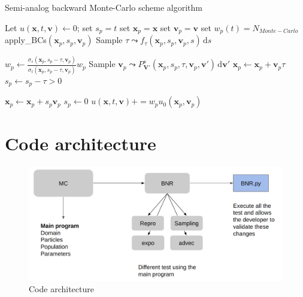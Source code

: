 \documentclass[a4paper, 11pt]{article}
\newcommand{\bm}{\symbf}
\newcommand{\di}{\ensuremath{\, \mathrm{d}}}
\begin{document}
\begin{algorithm}
	\caption{Semi-analog backward Monte-Carlo scheme algorithm}
	\begin{algorithmic}[1]
		\State Let $u(\bm{x}, t, \bm{v}) \gets 0$;
		\State set $s_p = t$
		\State set $\bm{x}_p = \bm{x}$
		\State set $\bm{v}_p = \bm{v}$
		\State set $w_p(t) = N_{Monte-Carlo}$
		\If{$\bm{x}_p \not \in \mathcal{D}$}
		\State apply\_BCs$(\bm{x}_p, s_p, \bm{v}_p)$
		\EndIf
		\State Sample $\tau \leadsto f_\tau(\bm{x}_p, s_p, \bm{v}_p, s) \di s$
		
		\State $w_p \gets \frac{\sigma_s(\bm{x}_p, s_p - \tau, \bm{v}_p)}{\sigma_t(\bm{x}_p, s_p - \tau, \bm{v}_p)} w_p$
		\State Sample $\bm{v}_p \leadsto P_{\bm{V}'}^s(\bm{x}_p, s_p, \tau, \bm{v}_p, \bm{v}') \di \bm{v}'$
		\State $\bm{x}_p \gets \bm{x}_p + \bm{v}_p \tau$
		\State $s_p \gets s_p - \tau > 0$
		
		\Else
		\State $\bm{x}_p \gets \bm{x}_p + s_p \bm{v}_p$
		\State $s_p \gets 0$
		\State $u(\bm{x}, t, \bm{v}) += w_p u_0(\bm{x}_p, \bm{v}_p)$
		\EndIf
		\EndWhile
		\EndFor
	\end{algorithmic}
\end{algorithm}






\section{Code architecture}


\begin{figure}[H]
	\centering
	\includegraphics[width=1.0\linewidth]{codestruct.png}
	\caption {Code architecture}
	\label{fig:code}
\end{figure}
\end{document}
